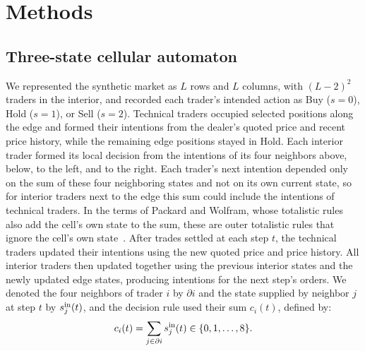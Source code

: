 \section{Methods}

\subsection{Three-state cellular automaton}

We represented the synthetic market as $L$ rows and $L$ columns, with
$(L-2)^2$ traders in the interior, and recorded each trader's intended
action as Buy ($s=0$), Hold ($s=1$), or Sell ($s=2$). Technical traders
occupied selected positions along the edge and formed their intentions
from the dealer's quoted price and recent price history, while the
remaining edge positions stayed in Hold. Each interior trader formed its
local decision from the intentions of its four neighbors above, below,
to the left, and to the right. Each trader's next intention depended
only on the sum of these four neighboring states and not on its own
current state, so for interior traders next to the edge this sum could
include the intentions of technical traders. In the terms of Packard and
Wolfram, whose totalistic rules also add the cell's own state to the
sum, these are outer totalistic rules that ignore the cell's own
state~\cite{packard1985two}.
After trades settled at each step $t$, the technical traders updated
their intentions using the new quoted price and price history. All
interior traders then updated together using the previous interior
states and the newly updated edge states, producing intentions for
the next step's orders. We denoted the four neighbors of
trader $i$ by $\partial i$ and the state supplied by neighbor $j$ at
step $t$ by $s_j^{\rm in}(t)$, and the decision rule used their sum
$c_i(t)$, defined by:
\begin{equation}
  c_i(t)=\sum_{j\in\partial i}s_j^{\rm in}(t)\in\{0,1,\ldots,8\}.
  \label{eq:neighborhood-sum}
\end{equation}

